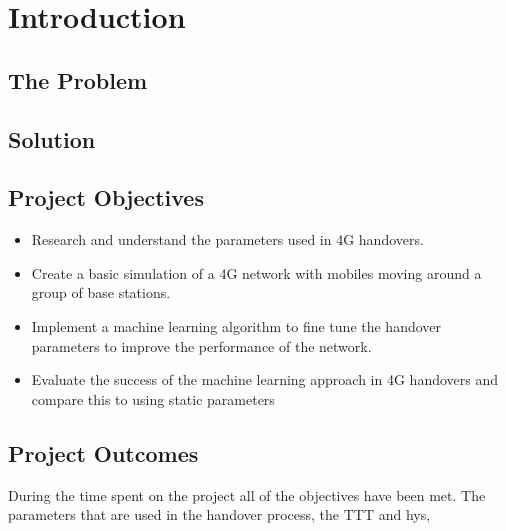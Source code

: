 \chapter{Introduction}
\section{The Problem}
\section{Solution}
\section{Project Objectives}
\begin{itemize}
	\item Research and understand the parameters used in 4G handovers.
	\item Create a basic simulation of a 4G network with mobiles moving around a group of base stations.
	\item Implement a machine learning algorithm to fine tune the handover parameters to improve the performance of the network.
	\item Evaluate the success of the machine learning approach in 4G handovers and compare this to using static parameters
\end{itemize}
\section{Project Outcomes}
During the time spent on the project all of the objectives have been met. The parameters that are used in the handover process, the \ac{TTT} and \ac{hys},
